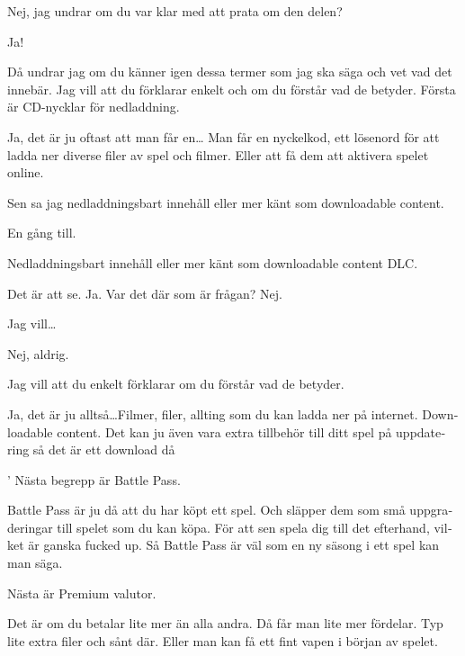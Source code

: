 \documentclass[11p]{article}
\begin{document}
\begin{otherlanguage}{swedish}
    \setlength{\leftskip}{0cm}
    Nej, jag undrar om du var klar med att prata om den delen?

    \setlength{\leftskip}{1cm}
    Ja!

    \setlength{\leftskip}{0cm}
    Då undrar jag om du känner igen dessa termer som jag ska säga och vet vad det innebär.
    Jag vill att du förklarar enkelt och om du förstår vad de betyder. Första är CD-nycklar för nedladdning.


    \setlength{\leftskip}{1cm}
    Ja, det är ju oftast att man får en\dots
    Man får en nyckelkod, ett lösenord för att ladda ner diverse filer av spel och filmer. Eller att få dem att aktivera spelet online.


    \setlength{\leftskip}{0cm}
    Sen sa jag nedladdningsbart innehåll eller mer känt som downloadable content.

    \setlength{\leftskip}{1cm}
    En gång till.

    \setlength{\leftskip}{0cm}
    Nedladdningsbart innehåll eller mer känt som downloadable content DLC.

    \setlength{\leftskip}{1cm}
    Det är att se. Ja.
    Var det där som är frågan? Nej.



    \setlength{\leftskip}{0cm}
    Jag vill\dots

    \setlength{\leftskip}{1cm}
    Nej, aldrig.

    \setlength{\leftskip}{0cm}
    Jag vill att du enkelt förklarar om du förstår vad de betyder.

    \setlength{\leftskip}{1cm}
    Ja, det är ju alltså\dots Filmer, filer, allting som du kan ladda ner på internet.
    Downloadable content. Det kan ju även vara extra tillbehör till ditt spel på uppdatering så det är ett download då


    \setlength{\leftskip}{0cm}'
    Nästa begrepp är Battle Pass.

    \setlength{\leftskip}{1cm}
    Battle Pass är ju då att du har köpt ett spel.
    Och släpper dem som små uppgraderingar till spelet som du kan köpa. För att sen spela dig till det efterhand, vilket är ganska fucked up.
    Så Battle Pass är väl som en ny säsong i ett spel kan man säga.


    \setlength{\leftskip}{0cm}
    Nästa är Premium valutor.

    \setlength{\leftskip}{1cm}
    Det är om du betalar lite mer än alla andra. Då får man lite mer fördelar. Typ lite extra filer och sånt där. Eller man kan få ett fint vapen i början av spelet.



\end{otherlanguage}
\end{document}
